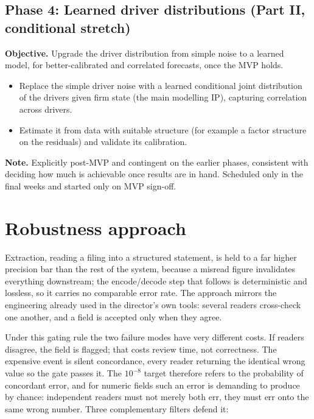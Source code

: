 \documentclass[11pt]{article}
\newcommand{\lead}[2]{\par\addvspace{5pt}\textbf{\textcolor{#1}{#2}}}
\begin{document}
\subsection{Phase 4: Learned driver distributions (Part II, conditional stretch)}
\lead{navytwo}{Objective.} Upgrade the driver distribution from simple noise to a learned model, for better-calibrated and correlated forecasts, once the MVP holds.
\begin{itemize}
  \item Replace the simple driver noise with a learned conditional joint distribution of the drivers given firm state (the main modelling IP), capturing correlation across drivers.
  \item Estimate it from data with suitable structure (for example a factor structure on the residuals) and validate its calibration.
\end{itemize}
\lead{navytwo}{Note.} Explicitly post-MVP and contingent on the earlier phases, consistent with deciding how much is achievable once results are in hand. Scheduled only in the final weeks and started only on MVP sign-off.

\section{Robustness approach}
\label{sec:robustness}
Extraction, reading a filing into a structured statement, is held to a far higher precision bar than the rest of the system, because a misread figure invalidates everything downstream; the encode/decode step that follows is deterministic and lossless, so it carries no comparable error rate. The approach mirrors the engineering already used in the director's own tools: several readers cross-check one another, and a field is accepted only when they agree.

Under this gating rule the two failure modes have very different costs. If readers disagree, the field is flagged; that costs review time, not correctness. The expensive event is silent concordance, every reader returning the identical wrong value so the gate passes it. The $10^{-8}$ target therefore refers to the probability of concordant error, and for numeric fields such an error is demanding to produce by chance: independent readers must not merely both err, they must err onto the same wrong number. Three complementary filters defend it:
\end{document}
